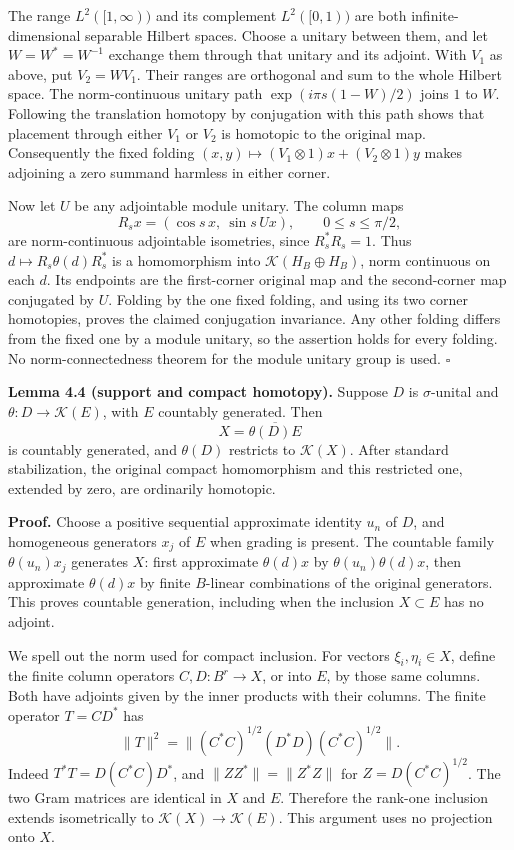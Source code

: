 \documentclass[
  11pt,
]{article}
\begin{document}
The range \(L^2([1,\infty))\) and its complement \(L^2([0,1))\) are both
infinite-dimensional separable Hilbert spaces. Choose a unitary between
them, and let \(W=W^*=W^{-1}\) exchange them through that unitary and
its adjoint. With \(V_1\) as above, put \(V_2=WV_1\). Their ranges are
orthogonal and sum to the whole Hilbert space. The norm-continuous
unitary path \(\exp(i\pi s(1-W)/2)\) joins \(1\) to \(W\). Following the
translation homotopy by conjugation with this path shows that placement
through either \(V_1\) or \(V_2\) is homotopic to the original map.
Consequently the fixed folding
\((x,y)\mapsto (V_1\otimes1)x+(V_2\otimes1)y\) makes adjoining a zero
summand harmless in either corner.

Now let \(U\) be any adjointable module unitary. The column maps \[
R_sx=(\cos s\,x,\ \sin s\,Ux),\qquad 0\leq s\leq\pi/2,
\tag{4.7}
\] are norm-continuous adjointable isometries, since \(R_s^*R_s=1\).
Thus \(d\mapsto R_s\theta(d)R_s^*\) is a homomorphism into
\(\mathcal K(H_B\oplus H_B)\), norm continuous on each \(d\). Its
endpoints are the first-corner original map and the second-corner map
conjugated by \(U\). Folding by the one fixed folding, and using its two
corner homotopies, proves the claimed conjugation invariance. Any other
folding differs from the fixed one by a module unitary, so the assertion
holds for every folding. No norm-connectedness theorem for the module
unitary group is used. \(\square\)

\textbf{Lemma 4.4 (support and compact homotopy).} Suppose \(D\) is
\(\sigma\)-unital and \(\theta:D\to\mathcal K(E)\), with \(E\) countably
generated. Then \[
X=\overline{\theta(D)E}
\tag{4.8}
\] is countably generated, and \(\theta(D)\) restricts to
\(\mathcal K(X)\). After standard stabilization, the original compact
homomorphism and this restricted one, extended by zero, are ordinarily
homotopic.

\textbf{Proof.} Choose a positive sequential approximate identity
\(u_n\) of \(D\), and homogeneous generators \(x_j\) of \(E\) when
grading is present. The countable family \(\theta(u_n)x_j\) generates
\(X\): first approximate \(\theta(d)x\) by \(\theta(u_n)\theta(d)x\),
then approximate \(\theta(d)x\) by finite \(B\)-linear combinations of
the original generators. This proves countable generation, including
when the inclusion \(X\subset E\) has no adjoint.

We spell out the norm used for compact inclusion. For vectors
\(\xi_i,\eta_i\in X\), define the finite column operators
\(C,D:B^r\to X\), or into \(E\), by those same columns. Both have
adjoints given by the inner products with their columns. The finite
operator \(T=CD^*\) has \[
\|T\|^2=\|(C^*C)^{1/2}(D^*D)(C^*C)^{1/2}\|.
\] Indeed \(T^*T=D(C^*C)D^*\), and \(\|ZZ^*\|=\|Z^*Z\|\) for
\(Z=D(C^*C)^{1/2}\). The two Gram matrices are identical in \(X\) and
\(E\). Therefore the rank-one inclusion extends isometrically to
\(\mathcal K(X)\to\mathcal K(E)\). This argument uses no projection onto
\(X\).
\end{document}
